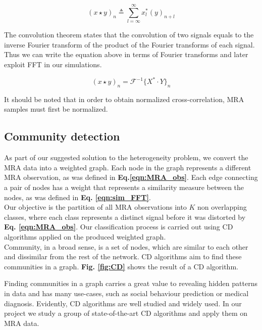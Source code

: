 \begin{equation}
\label{eqn:sim_def}
(x \star y)_n \triangleq \sum_{l=\infty}^{\infty}x^*_l(y)_{n+l}
\end{equation}

The convolution theorem states that the convolution of two signals  equals to the inverse Fourier transform of the product of the Fourier transforms of each signal. Thus we can write the equation above in terms of Fourier transforms and later exploit \acrshort{FFT} in our simulations.

\begin{equation}
\label{eqn:sim_FFT}
(x \star y)_n = \mathcal{F}^{-1}\lbrace X^* \cdot Y {\rbrace}_n
\end{equation}

It should be noted that in order to obtain normalized cross-correlation, \acrshort{MRA} samples must first be normalized.

\clearpage

\subsection{Community detection}

As part of our suggested solution to the heterogeneity problem, we convert the \acrshort{MRA} data into a weighted graph. Each node in the graph represents a different \acrshort{MRA} observation, as was defined in \textbf{Eq.\ref{eqn:MRA_obs}}. Each edge connecting a pair of nodes has a weight that represents a similarity measure between the nodes, as was defined in \textbf{Eq. \ref{eqn:sim_FFT}}.\\

Our objective is the partition of all \acrshort{MRA} observations into $K$ non overlapping classes, where each class represents a distinct signal before it was distorted by \textbf{Eq. \ref{eqn:MRA_obs}}. Our classification process is carried out using \acrfull{CD} algorithms applied on the produced weighted graph.\\

Community, in a broad sense, is a set of nodes, which are similar to each other and dissimilar from the rest of the network. \acrfull{CD} algorithms aim to find these communities in a graph. \textbf{Fig. \ref{fig:CD}} shows the result of a \acrshort{CD} algorithm.

Finding communities in a graph carries a great value to revealing hidden patterns in data and has many use-cases, such as social behaviour prediction \cite{zachary1976} or medical diagnosis\cite{guimera2005}. Evidently, \acrlong{CD} algorithms are well studied and widely used. In our project we study a group of state-of-the-art \acrshort{CD} algorithms and apply them on \acrshort{MRA} data.

